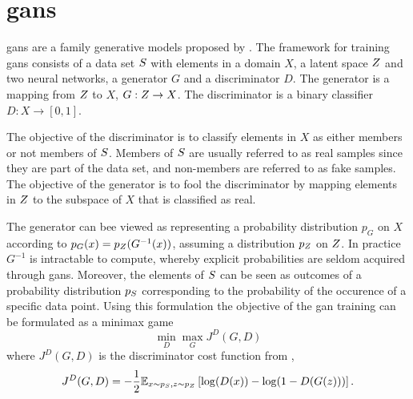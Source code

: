 \section{\acrlong{gans}}
\acrfull{gans} are a family generative models proposed by \textcite{goodfellow2014generative}. The framework for training \acrshort{gans} consists of a data set $S$ with elements in a domain $X$, a latent space $Z$ and two neural networks, a generator $G$ and a discriminator $D$. The generator is a mapping from $Z$ to $X$, $G: Z \rightarrow X$. The discriminator is a binary classifier $D: X \rightarrow [0, 1]$. 

The objective of the discriminator is to classify elements in $X$ as either members or not members of $S$. Members of $S$ are usually referred to as real samples since they are part of the data set, and non-members are referred to as fake samples. The objective of the generator is to fool the discriminator by mapping elements in $Z$ to the subspace of $X$ that is classified as real. 

The generator can bee viewed as representing a probability distribution $p_G$ on $X$ according to $p_G(x) = p_Z(G^{-1}(x))$, assuming a distribution $p_Z$ on $Z$. In practice $G^{-1}$ is intractable to compute, whereby explicit probabilities are seldom acquired through \acrshort{gans}. Moreover, the elements of $S$ can be seen as outcomes of a probability distribution $p_S$ corresponding to the probability of the occurence of a specific data point. Using this formulation the objective of the \acrshort{gan} training can be formulated as a minimax game 
\begin{equation}
    \min_D \max_G J^{D}(G, D)
\end{equation}
where $J^D(G, D)$ is the discriminator cost function from \parencite{goodfellow2016nips},
\begin{equation}
    J^D(G, D) = -\frac{1}{2}\mathbb{E}_{x \sim p_S, z \sim p_Z}\left[\log(D(x)) - \log(1 - D(G(z))) \right].
\end{equation}


